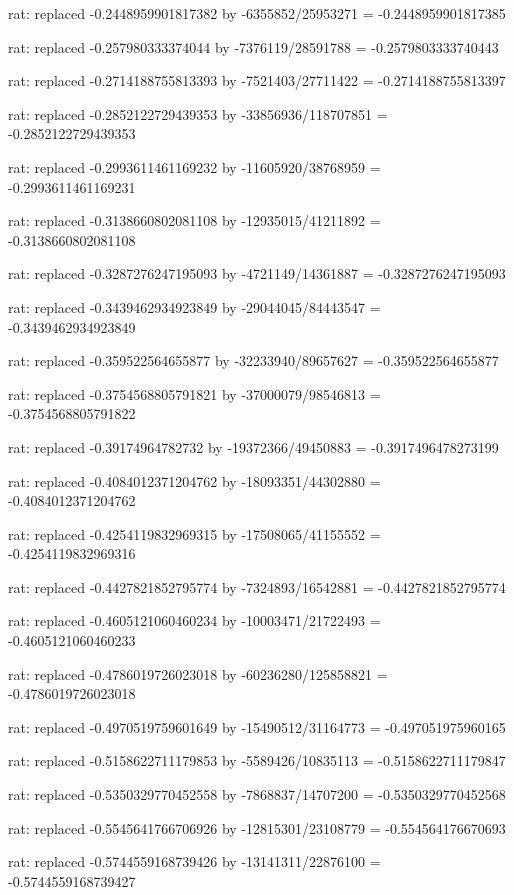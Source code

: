 \documentclass[a4paper,10pt]{article}
\begin{document}
\begin{eulernotebook}
\begin{eulercomment}
\begin{eulercomment}
\begin{eulercomment}
\begin{eulercomment}
\begin{eulercomment}
\begin{eulercomment}
\begin{eulercomment}
\begin{eulercomment}
\begin{eulercomment}
\begin{eulercomment}
\begin{eulercomment}
\begin{eulercomment}
\begin{eulercomment}
\begin{eulercomment}
\begin{eulercomment}
\begin{eulercomment}
\begin{euleroutput}
  rat: replaced -0.2448959901817382 by -6355852/25953271 = -0.2448959901817385
  
  rat: replaced -0.257980333374044 by -7376119/28591788 = -0.2579803333740443
  
  rat: replaced -0.2714188755813393 by -7521403/27711422 = -0.2714188755813397
  
  rat: replaced -0.2852122729439353 by -33856936/118707851 = -0.2852122729439353
  
  rat: replaced -0.2993611461169232 by -11605920/38768959 = -0.2993611461169231
  
  rat: replaced -0.3138660802081108 by -12935015/41211892 = -0.3138660802081108
  
  rat: replaced -0.3287276247195093 by -4721149/14361887 = -0.3287276247195093
  
  rat: replaced -0.3439462934923849 by -29044045/84443547 = -0.3439462934923849
  
  rat: replaced -0.359522564655877 by -32233940/89657627 = -0.359522564655877
  
  rat: replaced -0.3754568805791821 by -37000079/98546813 = -0.3754568805791822
  
  rat: replaced -0.39174964782732 by -19372366/49450883 = -0.3917496478273199
  
  rat: replaced -0.4084012371204762 by -18093351/44302880 = -0.4084012371204762
  
  rat: replaced -0.4254119832969315 by -17508065/41155552 = -0.4254119832969316
  
  rat: replaced -0.4427821852795774 by -7324893/16542881 = -0.4427821852795774
  
  rat: replaced -0.4605121060460234 by -10003471/21722493 = -0.4605121060460233
  
  rat: replaced -0.4786019726023018 by -60236280/125858821 = -0.4786019726023018
  
  rat: replaced -0.4970519759601649 by -15490512/31164773 = -0.497051975960165
  
  rat: replaced -0.5158622711179853 by -5589426/10835113 = -0.5158622711179847
  
  rat: replaced -0.5350329770452558 by -7868837/14707200 = -0.5350329770452568
  
  rat: replaced -0.5545641766706926 by -12815301/23108779 = -0.554564176670693
  
  rat: replaced -0.5744559168739426 by -13141311/22876100 = -0.5744559168739427
  

\end{euleroutput}
\end{eulercomment}
\end{eulercomment}
\end{eulercomment}
\end{eulercomment}
\end{eulercomment}
\end{eulercomment}
\end{eulercomment}
\end{eulercomment}
\end{eulercomment}
\end{eulercomment}
\end{eulercomment}
\end{eulercomment}
\end{eulercomment}
\end{eulercomment}
\end{eulercomment}
\end{eulercomment}
\end{eulernotebook}
\end{document}
